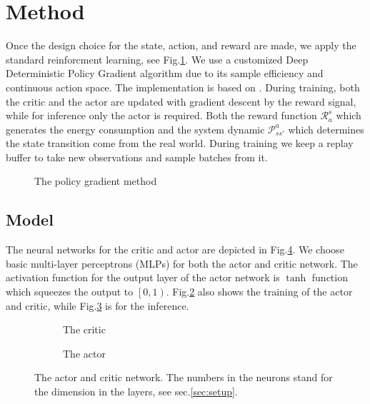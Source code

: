\documentclass{article}
\begin{document}
\section{Method}\label{sec:method}

Once the design choice for the state, action, and reward are made, we apply the standard reinforcment learning, see Fig.\@\ref{fig:policy gradient}. We use a customized Deep Deterministic Policy Gradient algorithm \parencite{lillicrap15:_contin} due to its sample efficiency and continuous action space. The implementation is based on \parencite{keras20:DDPG}. During training, both the critic and the actor are updated with gradient descent by the reward signal, while for inference only the actor is required. Both the reward function $\mathcal{R}_a^s$ which generates the energy consumption and the system dynamic $\mathcal{P}_{ss'}^{a}$ which determines the state transition come from the real world. During training we keep a replay buffer to take new observations and sample batches from it.

\begin{figure}[ht]
	\centering
	\def\svgwidth{0.8\columnwidth}
	
	\caption{\label{fig:rl_model} The policy gradient method}\label{fig:policy gradient}
\end{figure}

\subsection{Model}\label{sec:model}

The neural networks for the critic and actor are depicted in Fig.\@\ref{fig:actorcritic}. We choose basic multi-layer perceptrons (MLPs) for both the actor and critic network. The activation function for the output layer of the actor network is $\tanh$ function which squeezes the output to $\left[0,1\right)$. Fig.\@\ref{fig:critic} also shows the training of the actor and critic, while Fig.\@\ref{fig:actor} is for the inference.

\begin{figure}[ht]
	\centering
	\begin{subfigure}[b]{0.55\textwidth}
		\centering
		\def\svgwidth{\columnwidth}
		
		\caption{\label{fig:critic} The critic}
	\end{subfigure}
	\hfill
	\begin{subfigure}[b]{0.4\textwidth}
		\centering
		\def\svgwidth{\columnwidth}
		
		\caption{\label{fig:actor} The actor}
	\end{subfigure}
	\caption{The actor and critic network. The numbers in the neurons stand for the dimension in the layers, see sec.\@\ref{sec:setup}.}\label{fig:actorcritic}
\end{figure}
\end{document}
